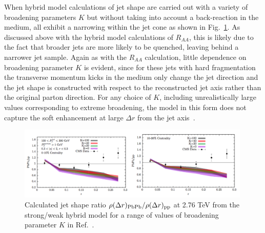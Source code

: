 When hybrid model calculations of jet shape are carried out with a variety of broadening parameters $K$ but without taking into account a back-reaction in the medium, all exhibit a narrowing within the jet cone as shown in Fig.~\ref{fig:Hybrid_JetShapes1}.  As discussed above with the hybrid model calculations of $R_{AA}$, this is likely due to the fact that broader jets are more likely to be quenched, leaving behind a narrower jet sample.  Again as with the $R_{AA}$ calculation, little dependence on broadening parameter $K$ is evident, since for these jets with hard fragmentation the transverse momentum kicks in the medium only change the jet direction and the jet shape is constructed with respect to the reconstructed jet axis rather than the original parton direction.  For any choice of $K$, including unrealistically large values corresponding to extreme broadening, the model in this form does not capture the soft enhancement at large $\Delta r$ from the jet axis~\cite{Casalderrey-Solana:2016jvj}. 

\begin{figure}[ht!]
\begin{center}
\includegraphics[width=0.99\textwidth]{figures/Models/Hybrid_JetShapes1.png}
\caption[Calculated jet shape ratio $\rho(\Delta r)_{\rm PbPb}/\rho(\Delta r)_{\rm pp}$ at 2.76 TeV from the hybrid model for a range of values of broadening parameter $K$]{Calculated jet shape ratio $\rho(\Delta r)_{\rm PbPb}/\rho(\Delta r)_{\rm pp}$ at 2.76 TeV from the strong/weak hybrid model for a range of values of broadening parameter $K$ in Ref.~\cite{Casalderrey-Solana:2016jvj}.}
\label{fig:Hybrid_JetShapes1}
\end{center}
\end{figure}

